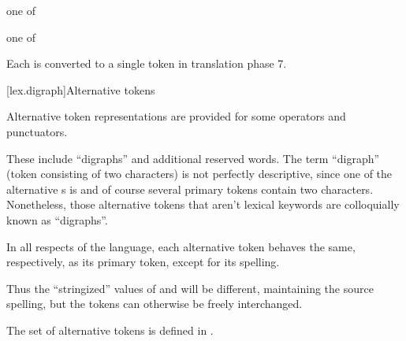 \begin{bnf}
\obeyspaces
{} \textnormal{one of}\br
    \terminal{\#        \#\#       \%:       \%:\%:}
\end{bnf}

\begin{bnf}
\obeyspaces
{} \textnormal{one of}\br
    \terminal{\{        \}        [        ]        (        )}\br
    \br
    \br
    \terminal{!        +        -        *        /        \%        \caret{}        \&        |}\br
    \terminal{=        +=       -=       *=       /=       \%=       \caret{}=       \&=       |=}\br
    \terminal{==       !=       <        >        <=       >=       <=>      \&\&       ||}\br
    \terminal{<<       >>       <<=      >>=      ++       --       ,}\br
    \br
\end{bnf}

Each  is converted to a single token
in translation phase 7.%
%

[lex.digraph]{Alternative tokens}

\pnum
{}%
Alternative token representations are provided for some operators and
punctuators.
\begin{footnote}
%
These include ``digraphs'' and additional reserved words. The term
``digraph'' (token consisting of two characters) is not perfectly
descriptive, since one of the alternative s is
\tcode{\%:\%:} and of course several primary tokens contain two
characters. Nonetheless, those alternative tokens that aren't lexical
keywords are colloquially known as ``digraphs''.
\end{footnote}

\pnum
In all respects of the language, each alternative token behaves the
same, respectively, as its primary token, except for its spelling.
\begin{footnote}
Thus the ``stringized'' values of
\tcode{[} and \tcode{<:} will be different, maintaining the source
spelling, but the tokens can otherwise be freely interchanged.
\end{footnote}
The set of alternative tokens is defined in
.

